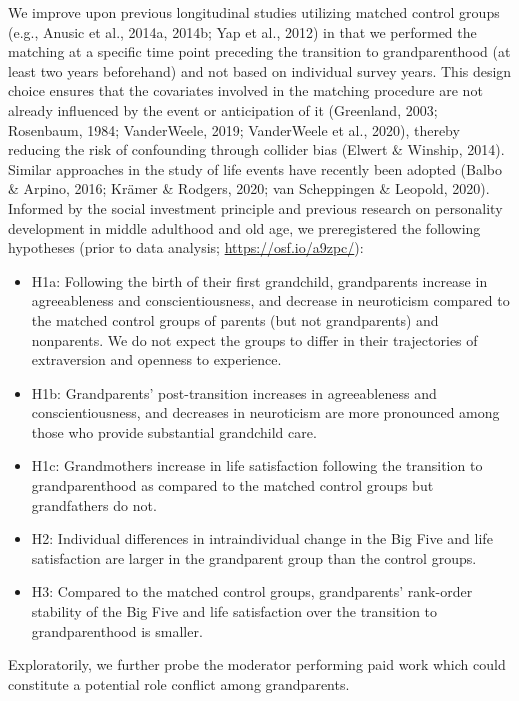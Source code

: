 \documentclass[
  english,
  man, noextraspace]{apa7}
\providecommand{\tightlist}{%
  \setlength{\itemsep}{0pt}\setlength{\parskip}{0pt}}
\begin{document}
We improve upon previous longitudinal studies utilizing matched control groups (e.g., Anusic et al., 2014a, 2014b; Yap et al., 2012) in that we performed the matching at a specific time point preceding the transition to grandparenthood (at least two years beforehand) and not based on individual survey years. This design choice ensures that the covariates involved in the matching procedure are not already influenced by the event or anticipation of it (Greenland, 2003; Rosenbaum, 1984; VanderWeele, 2019; VanderWeele et al., 2020), thereby reducing the risk of confounding through collider bias (Elwert \& Winship, 2014). Similar approaches in the study of life events have recently been adopted (Balbo \& Arpino, 2016; Krämer \& Rodgers, 2020; van Scheppingen \& Leopold, 2020).\\
Informed by the social investment principle and previous research on personality development in middle adulthood and old age, we preregistered the following hypotheses (prior to data analysis; \url{https://osf.io/a9zpc/}):

\begin{itemize}
\tightlist
\item
  H1a: Following the birth of their first grandchild, grandparents increase in agreeableness and conscientiousness, and decrease in neuroticism compared to the matched control groups of parents (but not grandparents) and nonparents. We do not expect the groups to differ in their trajectories of extraversion and openness to experience.
\item
  H1b: Grandparents' post-transition increases in agreeableness and conscientiousness, and decreases in neuroticism are more pronounced among those who provide substantial grandchild care.
\item
  H1c: Grandmothers increase in life satisfaction following the transition to grandparenthood as compared to the matched control groups but grandfathers do not.
\item
  H2: Individual differences in intraindividual change in the Big Five and life satisfaction are larger in the grandparent group than the control groups.
\item
  H3: Compared to the matched control groups, grandparents' rank-order stability of the Big Five and life satisfaction over the transition to grandparenthood is smaller.
\end{itemize}

Exploratorily, we further probe the moderator performing paid work which could constitute a potential role conflict among grandparents.
\end{document}
